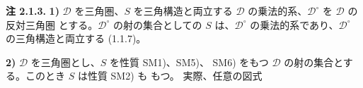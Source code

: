 \medskip
\noindent\textbf{注 2.1.3.}\quad
{}
\textbf{1)} $\mathcal D$ を三角圏、$S$ を三角構造と両立する
$\mathcal D$ の乗法的系、$\mathcal D^\circ$ を $\mathcal D$ の反対三角圏
とする。$\mathcal D^\circ$ の射の集合としての $S$ は、$\mathcal D^\circ$
の乗法的系であり、$\mathcal D^\circ$ の三角構造と両立する (1.1.7)。

\smallskip
\noindent\textbf{2)} $\mathcal D$ を三角圏とし、$S$ を性質 SM1)、SM5)、
SM6) をもつ $\mathcal D$ の射の集合とする。このとき $S$ は性質 SM2) も
もつ。
実際、任意の図式

\begin{center}
\end{center}
\endgroup
